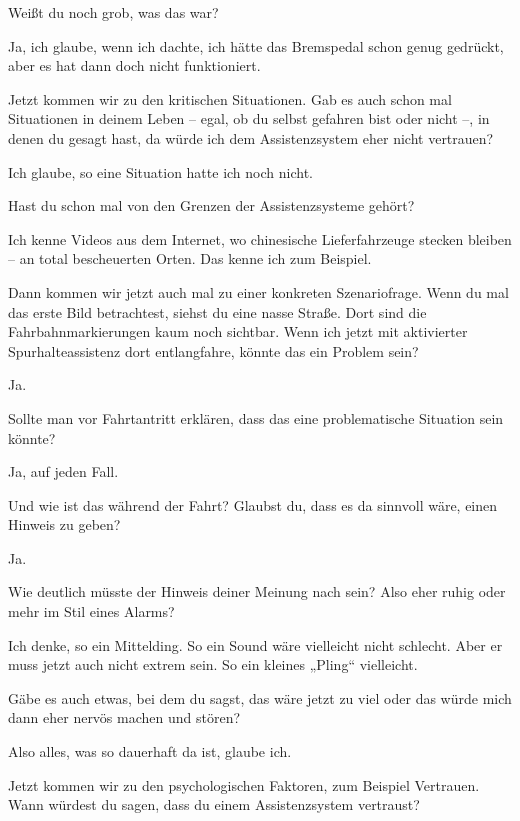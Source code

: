 \interviewerin
Weißt du noch grob, was das war?

Ja, ich glaube, wenn ich dachte, ich hätte das Bremspedal schon genug
gedrückt, aber es hat dann doch nicht funktioniert.

\interviewerin
Jetzt kommen wir zu den kritischen Situationen. Gab es auch schon mal
Situationen in deinem Leben – egal, ob du selbst gefahren bist oder
nicht –, in denen du gesagt hast, da würde ich dem Assistenzsystem eher
nicht vertrauen?

Ich glaube, so eine Situation hatte ich noch nicht.

\interviewerin
Hast du schon mal von den Grenzen der Assistenzsysteme gehört?

Ich kenne Videos aus dem Internet, wo chinesische Lieferfahrzeuge
stecken bleiben – an total bescheuerten Orten. Das kenne ich zum
Beispiel.

\interviewerin
Dann kommen wir jetzt auch mal zu einer konkreten Szenariofrage. Wenn
du mal das erste Bild betrachtest, siehst du eine nasse Straße. Dort
sind die Fahrbahnmarkierungen kaum noch sichtbar. Wenn ich jetzt mit
aktivierter Spurhalteassistenz dort entlangfahre, könnte das ein
Problem sein?

Ja.

\interviewerin
Sollte man vor Fahrtantritt erklären, dass das eine problematische
Situation sein könnte?

Ja, auf jeden Fall.

\interviewerin
Und wie ist das während der Fahrt? Glaubst du, dass es da sinnvoll
wäre, einen Hinweis zu geben?

Ja.

\interviewerin
Wie deutlich müsste der Hinweis deiner Meinung nach sein? Also eher
ruhig oder mehr im Stil eines Alarms?

Ich denke, so ein Mittelding. So ein Sound wäre vielleicht nicht
schlecht. Aber er muss jetzt auch nicht extrem sein. So ein kleines
„Pling“ vielleicht.

\interviewerin
Gäbe es auch etwas, bei dem du sagst, das wäre jetzt zu viel oder das
würde mich dann eher nervös machen und stören?

Also alles, was so dauerhaft da ist, glaube ich.

\interviewerin
Jetzt kommen wir zu den psychologischen Faktoren, zum Beispiel
Vertrauen. Wann würdest du sagen, dass du einem Assistenzsystem
vertraust?

